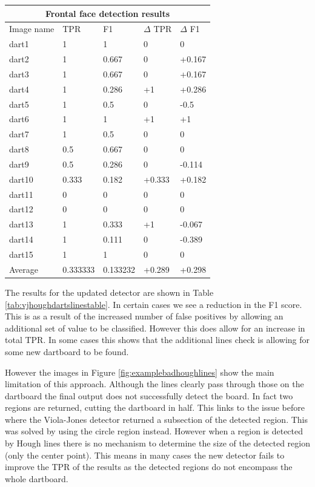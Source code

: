 \documentclass{article}
\begin{document}
\begin{multicols}{2}
\begin{center}
\begin{tabular}{ |p{1.3cm}||p{1.3cm}|p{1.3cm}|p{1.3cm}|p{1.3cm}| }
 \hline
 \multicolumn{5}{|c|}{Frontal face detection results} \\
 \hline
 Image name & TPR & F1 & \(\Delta\) TPR & \(\Delta\) F1 \\
 \hline
 dart1  & 1  & 1 & 0 & 0 \\
 dart2  & 1  & 0.667 & 0 & +0.167       \\
 dart3  & 1  & 0.667 & 0 & +0.167      \\
 dart4  & 1  & 0.286 & +1 & +0.286         \\
 dart5  & 1  & 0.5 & 0 & -0.5         \\
 dart6  & 1  & 1 & +1 & +1 \\
 dart7  & 1  & 0.5 & 0 & 0         \\
 dart8  & 0.5  & 0.667 & 0 & 0   \\
 dart9  & 0.5  & 0.286 & 0 & -0.114           \\
 dart10 & 0.333  & 0.182 & +0.333 & +0.182          \\
 dart11 & 0  & 0 & 0 & 0 \\
 dart12 & 0  & 0 & 0 & 0         \\
 dart13 & 1  & 0.333 & +1 & -0.067         \\
 dart14 & 1  & 0.111 & 0 & -0.389        \\
 dart15 & 1  & 1   & 0 & 0     \\
 \hline
 Average& 0.333333  & 0.133232 & +0.289 & +0.298   \\ 
 \hline
\end{tabular}
  \label{tab:vjhoughdartslinestable}
  \end{center}

  The results for the updated detector are shown in Table \ref{tab:vjhoughdartslinestable}. In certain cases we see a reduction in the F1 score. This is as a result of the increased number of false positives by allowing an additional set of value to be classified. However this does allow for an increase in total TPR. In some cases this shows that the additional lines check is allowing for some new dartboard to be found.

  However the images in Figure \ref{fig:examplebadhoughlines} show the main limitation of
  this approach. Although the lines clearly pass through those on the dartboard
  the final output does not successfully detect the board. In fact two regions are returned, cutting the dartboard in half. This links to the issue before where the Viola-Jones detector returned a subsection of the detected region. This was solved by using the circle region instead. However when a region is detected by Hough lines there is no mechanism to determine the size of the detected region (only the center point). This means in many cases the new detector fails to improve the TPR of the results as the detected regions do not encompass the whole dartboard.



\end{multicols}
\end{document}
